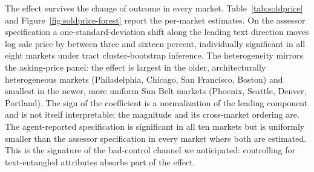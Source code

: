 The effect survives the change of outcome in every market. Table~\ref{tab:soldprice}
and Figure~\ref{fig:soldprice-forest} report the per-market estimates. On the assessor specification a one-standard-deviation shift along the leading text direction moves log sale price by between three and sixteen percent, individually significant in all eight markets under tract cluster-bootstrap inference. The heterogeneity mirrors the asking-price panel: the effect is largest in the older, architecturally heterogeneous markets (Philadelphia, Chicago, San Francisco, Boston) and smallest in the newer, more uniform Sun Belt markets (Phoenix, Seattle, Denver, Portland). The sign of the
coefficient is a normalization of the leading component and is not itself
interpretable; the magnitude and its cross-market ordering are. The agent-reported specification is significant in all ten markets but is uniformly smaller than the assessor specification in every market where both are estimated. This is the signature of the bad-control channel we anticipated: controlling for text-entangled attributes absorbs part of the effect.


